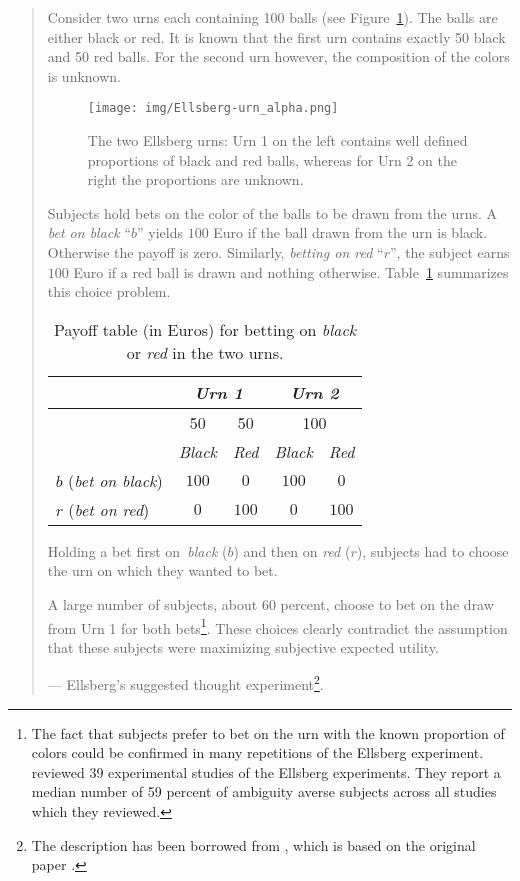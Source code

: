 \documentclass{article}
\begin{document}
\begin{quote}

Consider two urns each containing 100 balls (see Figure~\ref{fig:Ellsberg}).
The balls are either black or red. It is known that the first urn contains
exactly 50 black and 50 red balls. For the second urn however, the
composition of the colors is unknown.

\strut

\begin{figure}[H]
    \centering
    \texttt{[image: img/Ellsberg-urn\_alpha.png]}
    \caption{The two Ellsberg urns: Urn 1 on the left contains well defined proportions of black and red balls, whereas for Urn 2 on the right the proportions are unknown.}
    \label{fig:Ellsberg}
\end{figure}

\strut

Subjects hold bets on the color of the balls to be drawn from the urns. A 
\emph{bet on black }``$b$'' yields $100$ Euro if the ball drawn from the urn
is black. Otherwise the payoff is zero. Similarly, \emph{betting on red }``$%
r$'', the subject earns $100$ Euro if a red ball is drawn and nothing
otherwise. Table~\ref{tab:Ellsberg} summarizes this choice problem.


\begin{table}[H]
\centering
\begin{tabular}{|l|c|c|c|c|}
\hline
& \multicolumn{2}{|c}{\emph{Urn 1}} & \multicolumn{2}{|c|}{\emph{Urn 2}} \\ 
\hline
& 50 & 50 & \multicolumn{2}{|c|}{100} \\ \hline
& \emph{Black} & \emph{Red} & \emph{Black} & \emph{Red} \\ \hline
$b$ (\emph{bet on black}) & $100$ & $0$ & $100$ & $0$ \\ \hline
$r$ (\emph{bet on red}) & $0$ & $100$ & $0$ & $100$ \\ \hline
\end{tabular}%
\caption{Payoff table (in Euros) for betting on \emph{black} or \emph{red} in the two urns.}
\label{tab:Ellsberg}
\end{table}


Holding a bet first on\emph{\ black} ($b$) and then on \emph{red }($r$),
subjects had to choose the urn on which they wanted to bet.

A large number of subjects, about 60 percent, choose to bet on the draw from
Urn 1 for both bets\footnote{%
The fact that subjects prefer to bet on the urn with the known proportion of
colors could be confirmed in many repetitions of the Ellsberg experiment. 
\cite{paper:AmbiguityReview} reviewed 39 experimental studies of the
Ellsberg experiments. They report a median number of 59 percent of ambiguity
averse subjects across all studies which they reviewed.}. These choices
clearly contradict the assumption that these subjects were maximizing subjective expected utility.

    
    \hfill --- Ellsberg's suggested thought experiment\footnote{The description has been borrowed from \cite{paper:EllsbergHilbert}, which is based on the original paper \cite{paper:Ellsberg1961}.}.
    \end{quote}
\end{document}
